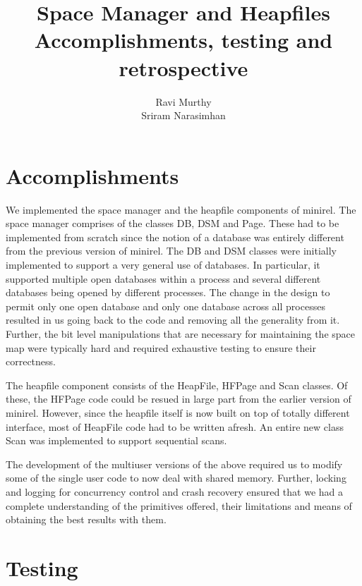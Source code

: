 \title{Space Manager and Heapfiles\\
	Accomplishments, testing and retrospective}
\author{Ravi Murthy \\
        Sriram Narasimhan}
\date{}

\maketitle

\section{Accomplishments}

We  implemented the space   manager   and the heapfile  components  of
minirel.  The   space manager  comprises of the   classes  DB, DSM and
Page. These had to be  implemented from scratch since  the notion of a
database      was entirely different  from   the   previous version of
minirel. The DB and DSM classes were  initially implemented to support
a very general use of databases.  In particular, it supported multiple
open databases within a  process and several different databases being
opened by different processes. The change in the design to permit only
one open database and only one  database across all processes resulted
in  us going back   to the code and  removing  all the generality from
it.  Further,  the  bit level manipulations   that  are necessary  for
maintaining the space map were  typically hard and required exhaustive
testing to ensure their correctness.

The heapfile  component consists of    the HeapFile, HFPage  and  Scan
classes. Of these, the HFPage code could be resued  in large part from
the earlier version of minirel.  However, since the heapfile itself is
now built on top of totally different interface, most of HeapFile code
had to be written afresh. An entire new  class Scan was implemented to
support sequential scans.

The development of the multiuser versions of the  above required us to
modify   some  of  the single  user  code  to    now  deal with shared
memory. Further, locking and logging for concurrency control and crash
recovery ensured    that   we had a    complete   understanding of the
primitives offered, their limitations and  means of obtaining the best
results with them.


\section{Testing}


